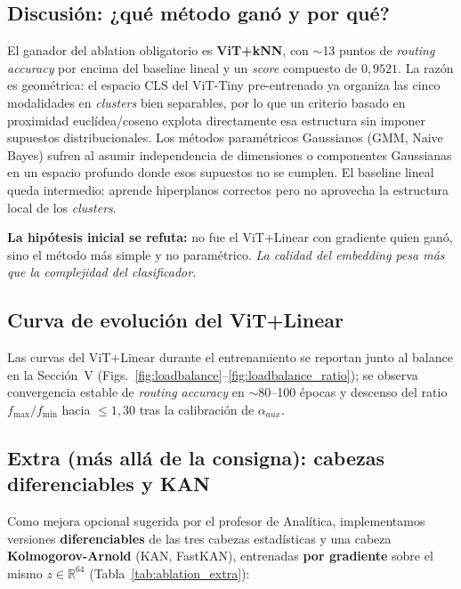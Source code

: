 \documentclass[conference]{IEEEtran}
\begin{document}
\subsection{Discusión: ¿qué método ganó y por qué?}

El ganador del ablation obligatorio es \textbf{ViT+k\textendash NN}, con $\sim$13 puntos de \textit{routing accuracy} por encima del baseline lineal y un \textit{score} compuesto de $0{,}9521$. La razón es geométrica: el espacio CLS del ViT-Tiny pre-entrenado ya organiza las cinco modalidades en \textit{clusters} bien separables, por lo que un criterio basado en proximidad euclídea/coseno explota directamente esa estructura sin imponer supuestos distribucionales. Los métodos paramétricos Gaussianos (GMM, Naive Bayes) sufren al asumir independencia de dimensiones o componentes Gaussianas en un espacio profundo donde esos supuestos no se cumplen. El baseline lineal queda intermedio: aprende hiperplanos correctos pero no aprovecha la estructura local de los \textit{clusters}.

\textbf{La hipótesis inicial se refuta:} no fue el ViT+Linear con gradiente quien ganó, sino el método más simple y no paramétrico. \textit{La calidad del embedding pesa más que la complejidad del clasificador.}

\subsection{Curva de evolución del ViT+Linear}
Las curvas del ViT+Linear durante el entrenamiento se reportan junto al balance en la Sección~V (Figs.~\ref{fig:loadbalance}--\ref{fig:loadbalance_ratio}); se observa convergencia estable de \textit{routing accuracy} en $\sim$80--100 épocas y descenso del ratio $f_{\max}/f_{\min}$ hacia $\le 1{,}30$ tras la calibración de $\alpha_{aux}$.

\subsection{Extra (más allá de la consigna): cabezas diferenciables y KAN}

Como mejora opcional sugerida por el profesor de Analítica, implementamos versiones \textbf{diferenciables} de las tres cabezas estadísticas y una cabeza \textbf{Kolmogorov-Arnold} (KAN, FastKAN), entrenadas \textbf{por gradiente} sobre el mismo $z\in\mathbb{R}^{64}$ (Tabla~\ref{tab:ablation_extra}):
\end{document}
